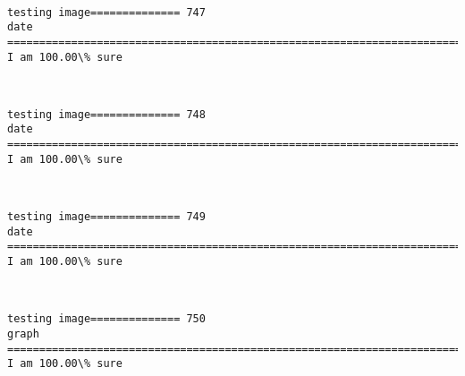 \documentclass[11pt]{article}
\begin{document}
    \begin{center}
    \end{center}
    { \hspace*{\fill} \\}
    
    \begin{Verbatim}[commandchars=\\\{\}]
testing image============== 747
date
============================================================================
I am 100.00\% sure

    \end{Verbatim}

    \begin{center}
    \end{center}
    { \hspace*{\fill} \\}
    
    \begin{Verbatim}[commandchars=\\\{\}]
testing image============== 748
date
============================================================================
I am 100.00\% sure

    \end{Verbatim}

    \begin{center}
    \end{center}
    { \hspace*{\fill} \\}
    
    \begin{Verbatim}[commandchars=\\\{\}]
testing image============== 749
date
============================================================================
I am 100.00\% sure

    \end{Verbatim}

    \begin{center}
    \end{center}
    { \hspace*{\fill} \\}
    
    \begin{Verbatim}[commandchars=\\\{\}]
testing image============== 750
graph
============================================================================
I am 100.00\% sure

    \end{Verbatim}
\end{document}
